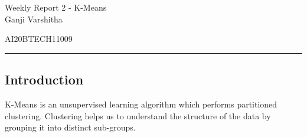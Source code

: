 \documentclass[12pt,letterpaper, onecolumn]{exam}
\begin{document}
\newtheorem{theorem}{Theorem}[section]
\newtheorem{problem}{Problem}
\newtheorem{proposition}{Proposition}[section]
\newtheorem{lemma}{Lemma}[section]
\newtheorem{corollary}[theorem]{Corollary}
\newtheorem{example}{Example}[section]
\newtheorem{definition}[problem]{Definition}

\newcommand{\BEQA}{\begin{eqnarray}}
\newcommand{\EEQA}{\end{eqnarray}}
\newcommand{\define}{\stackrel{\triangle}{=}}

\raggedbottom
\setlength{\parindent}{0pt}
\providecommand{\mbf}{\mathbf}
\providecommand{\norm}[1]{\lVert#1\rVert}
\providecommand{\pr}[1]{\ensuremath{\Pr\left(#1\right)}}
\providecommand{\qfunc}[1]{\ensuremath{Q\left(#1\right)}}
\providecommand{\sbrak}[1]{\ensuremath{{}\left[#1\right]}}
\providecommand{\lsbrak}[1]{\ensuremath{{}\left[#1\right.}}
\providecommand{\rsbrak}[1]{\ensuremath{{}\left.#1\right]}}
\providecommand{\brak}[1]{\ensuremath{\left(#1\right)}}
\providecommand{\lbrak}[1]{\ensuremath{\left(#1\right.}}
\providecommand{\rbrak}[1]{\ensuremath{\left.#1\right)}}
\providecommand{\cbrak}[1]{\ensuremath{\left\{#1\right\}}}
\providecommand{\lcbrak}[1]{\ensuremath{\left\{#1\right.}}
\providecommand{\rcbrak}[1]{\ensuremath{\left.#1\right\}}}
\let\vec\mathbf




\begingroup  
    \centering
    
    \LARGE Weekly Report 2 - K-Means\\[0.5em]
    
    \large Ganji Varshitha\par
    \large AI20BTECH11009\par
\endgroup
\rule{\textwidth}{0.4pt}
\pointsdroppedatright   %
\printanswers
\newcommand\Solution{
  \textbf{Solution:}\\}
\newcommand{\myvec}[1]{\ensuremath{\begin{bmatrix}#1\end{bmatrix}}}

 \subsection*{Introduction}
K-Means is an unsupervised learning algorithm which performs partitioned clustering. Clustering helps us to understand the structure of the data by grouping it into distinct sub-groups.
\end{document}
